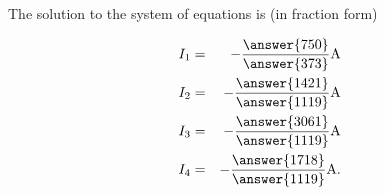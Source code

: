 \documentclass{ximera}
\begin{document}
\begin{problem}
        The solution to the system of equations is (in fraction form)
  
      \begin{eqnarray*}
        I_1 &=& -\frac{\answer{750}}{\answer{373}} \amp \\
        I_2 &=& -\frac{\answer{1421}}{\answer{1119}} \amp \\
        I_3 &=& -\frac{\answer{3061}}{\answer{1119}} \amp \\
        I_4 &=& -\frac{\answer{1718}}{\answer{1119}} \amp.
      \end{eqnarray*}
  
  

\end{problem}
\end{document}
